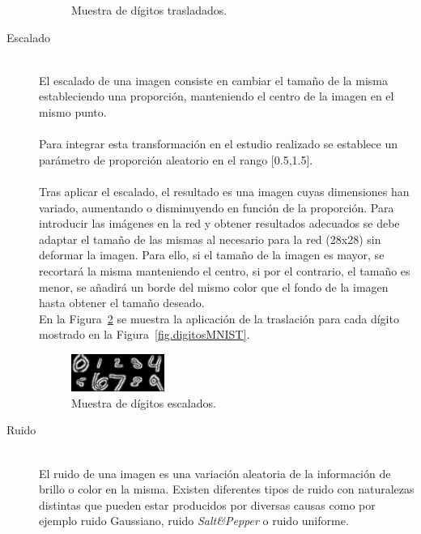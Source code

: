 \begin{description}
\begin{figure}[H]
\begin{center}
			\caption{Muestra de dígitos trasladados.}
			\label{fig.traslacion}
		\end{center}
	\end{figure}
	\vspace{-10pt}
	\item[Escalado] \hfill 
	\vspace{5pt}
	\\
	El escalado de una imagen consiste en cambiar el tamaño de la misma estableciendo una proporción, manteniendo el centro de la imagen en el mismo punto.\\
	\vspace{-10pt}
	\\
	Para integrar esta transformación en el estudio realizado se establece un parámetro de proporción aleatorio en el rango [0.5,1.5].\\
	\vspace{-10pt}
	\\
	Tras aplicar el escalado, el resultado es una imagen cuyas dimensiones han variado, aumentando o disminuyendo en función de la proporción. Para introducir las imágenes en la red y obtener resultados adecuados se debe adaptar el tamaño de las mismas al necesario para la red (28x28) sin deformar la imagen. Para ello, si el tamaño de la imagen es mayor, se recortará la misma manteniendo el centro, si por el contrario, el tamaño es menor, se añadirá un borde del mismo color que el fondo de la imagen hasta obtener el tamaño deseado.
	\vspace{10pt}
	\\
	En la Figura~\ref{fig.escalado} se muestra la aplicación de la traslación para cada dígito mostrado en la Figura~\ref{fig.digitosMNIST}.
	\begin{figure}[H]
		\begin{center}
			\includegraphics[width=0.3\textwidth]{figures/escala}
			\caption{Muestra de dígitos escalados.}
			\label{fig.escalado}
		\end{center}
	\end{figure}
	\item[Ruido] \hfill 
	\vspace{10pt}
	\\
	El ruido de una imagen es una variación aleatoria de la información de brillo o color en la misma. Existen diferentes tipos de ruido con naturalezas distintas que pueden estar producidos por diversas causas como por ejemplo ruido Gaussiano, ruido \textit{Salt\&Pepper} o ruido uniforme.\\

\end{description}

